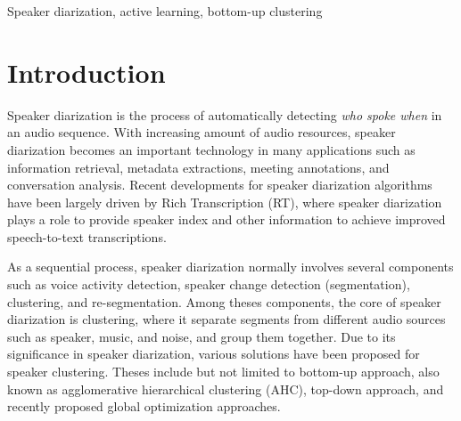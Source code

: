 \documentclass[journal]{IEEEtran}
\begin{document}
\begin{IEEEkeywords}
Speaker diarization, active learning, bottom-up clustering
\end{IEEEkeywords}

%
\IEEEpeerreviewmaketitle

\section{Introduction}
Speaker diarization is the process of automatically detecting \textit{who spoke when }in an audio sequence. With increasing amount of audio resources, speaker diarization becomes an important technology in many applications such as information retrieval, metadata extractions, meeting annotations, and conversation analysis. Recent developments for speaker diarization algorithms have been largely driven by Rich Transcription (RT), where speaker diarization plays a role to provide speaker index and other information to achieve improved speech-to-text transcriptions.

As a sequential process, speaker diarization normally involves several components such as voice activity detection, speaker change detection (segmentation), clustering, and re-segmentation. Among theses components, the core of speaker diarization is clustering, where it separate segments from different audio sources such as speaker, music, and noise, and group them together. Due to its significance in speaker diarization, various solutions have been proposed for speaker clustering. Theses include but not limited to bottom-up approach, also known as agglomerative hierarchical clustering (AHC), top-down approach, and recently proposed global optimization approaches. 
\end{document}
